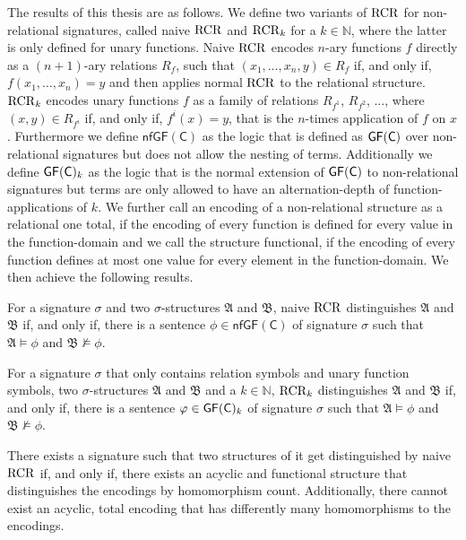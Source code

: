The results of this thesis are as follows.
We define two variants of $\operatorname{RCR}$ for non-relational signatures, called naive $\operatorname{RCR}$ and $\operatorname{RCR}_k$ for a $k\in\mathbb{N}$, where the latter is only defined for unary functions.
Naive $\operatorname{RCR}$ encodes $n$-ary functions $f$ directly as a $(n+1)$-ary relations $R_f$, such that $(x_1,\dots,x_n,y)\in R_f$ if, and only if, $f(x_1,\dots,x_n)=y$ and then applies normal $\operatorname{RCR}$ to the relational structure.
$\operatorname{RCR}_k$ encodes unary functions $f$ as a family of relations $R_{f^1}$, $R_{f^2}$, $\dots$, where $(x,y)\in R_{f^i}$ if, and only if, $f^i(x)=y$, that is the $n$-times application of $f$ on $x$.
Furthermore we define $\mathsf{nfGF}(\mathsf C)$ as the logic that is defined as $\mathsf{GF}(\mathsf{C})$ over non-relational signatures but does not allow the nesting of terms. 
Additionally we define $\mathsf{GF}(\mathsf{C})_k$ as the logic that is the normal extension of $\mathsf{GF}(\mathsf{C})$ to non-relational signatures but terms are only allowed to have an alternation-depth of function-applications of $k$.
We further call an encoding of a non-relational structure as a relational one total, if the encoding of every function is defined for every value in the function-domain and we call the structure functional, if the encoding of every function defines at most one value for every element in the function-domain.
We then achieve the following results.

\begin{theorem}
For a signature $\sigma$ and two $\sigma$-structures $\mathfrak A$ and $\mathfrak B$, naive $\operatorname{RCR}$ distinguishes $\mathfrak A$ and $\mathfrak B$ if, and only if, there is a sentence $\phi\in \mathsf{nfGF}(\mathsf C)$ of signature $\sigma$ such that $\mathfrak A\models \phi$ and $\mathfrak B\not\models \phi$.
\end{theorem}

\begin{theorem}
For a signature $\sigma$ that only contains relation symbols and unary function symbols, two $\sigma$-structures $\mathfrak A$ and $\mathfrak B$ and a $k\in\mathbb N$, $\operatorname{RCR}_k$ distinguishes $\mathfrak A$ and $\mathfrak B$ if, and only if, there is a sentence $\varphi\in \mathsf{GF}(\mathsf{C})_k$ of signature $\sigma$ such that $\mathfrak A\models \phi$ and $\mathfrak B\not\models \phi$.
\end{theorem}

\begin{theorem}
There exists a signature such that two structures of it get distinguished by naive $\operatorname{RCR}$ if, and only if, there exists an acyclic and functional structure that distinguishes the encodings by homomorphism count.
Additionally, there cannot exist an acyclic, total encoding that has differently many homomorphisms to the encodings.
\end{theorem}

